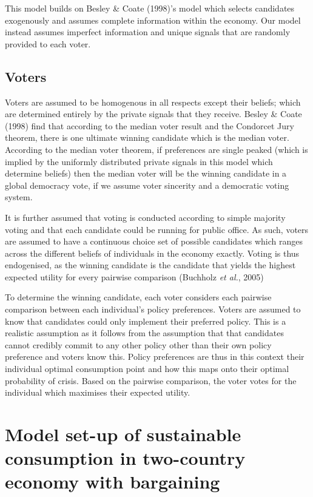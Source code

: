 \documentclass[11pt,preprint, authoryear]{elsarticle}
\numberwithin{equation}{section}
\numberwithin{figure}{section}
\numberwithin{table}{section}
\begin{document}
This model builds on Besley \& Coate (1998)'s model which selects
candidates exogenously and assumes complete information within the
economy. Our model instead assumes imperfect information and unique
signals that are randomly provided to each voter.

\hypertarget{voters}{%
\subsection*{Voters}\label{voters}}

Voters are assumed to be homogenous in all respects except their
beliefs; which are determined entirely by the private signals that they
receive. Besley \& Coate (1998) find that according to the median voter
result and the Condorcet Jury theorem, there is one ultimate winning
candidate which is the median voter. According to the median voter
theorem, if preferences are single peaked (which is implied by the
uniformly distributed private signals in this model which determine
beliefs) then the median voter will be the winning candidate in a global
democracy vote, if we assume voter sincerity and a democratic voting
system.

It is further assumed that voting is conducted according to simple
majority voting and that each candidate could be running for public
office. As such, voters are assumed to have a continuous choice set of
possible candidates which ranges across the different beliefs of
individuals in the economy exactly. Voting is thus endogenised, as the
winning candidate is the candidate that yields the highest expected
utility for every pairwise comparison (Buchholz \emph{et al.}, 2005)

To determine the winning candidate, each voter considers each pairwise
comparison between each individual's policy preferences. Voters are
assumed to know that candidates could only implement their preferred
policy. This is a realistic assumption as it follows from the assumption
that that candidates cannot credibly commit to any other policy other
than their own policy preference and voters know this. Policy
preferences are thus in this context their individual optimal
consumption point and how this maps onto their optimal probability of
crisis. Based on the pairwise comparison, the voter votes for the
individual which maximises their expected utility.

\hypertarget{model-set-up-of-sustainable-consumption-in-two-country-economy-with-bargaining}{%
\section{Model set-up of sustainable consumption in two-country economy
with
bargaining}\label{model-set-up-of-sustainable-consumption-in-two-country-economy-with-bargaining}}
\end{document}
